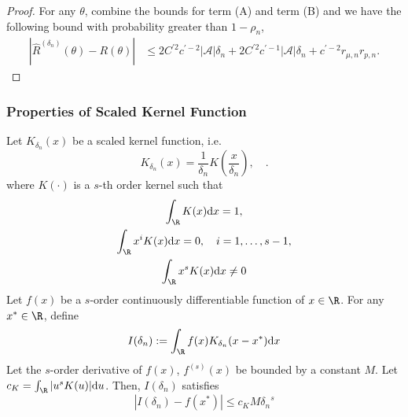 \begin{proof}
\noindent
For any $\theta$, combine the bounds for term (A) and term (B) and we have the following bound with probability greater than $1-\rho_n$,
\begin{align*}
    \left| \widehat R^{({\delta_n})}(\theta) - R(\theta) \right|&\leq 2C^{\prime2}c^{\prime-2}|\mathcal{A}|\delta_n +2C^{\prime2}c^{\prime-1}|\mathcal{A}|\delta_n + c^{\prime-2}r_{\mu,n}r_{p,n}.
\end{align*}

\end{proof}

\subsubsection{Properties of Scaled Kernel Function}

\begin{lemma}\label{lemma:bias_rate_of_kernel_convolution} Let $K_{\delta_n}(x)$ be a scaled kernel function, i.e.
$$K_{\delta_n}(x) = \frac{1}{{\delta_n}}K\left(\frac{x}{{\delta_n}}\right),\quad .$$
where $K(\cdot)$ is a $s$-th order kernel such that
\begin{gather*}
    \int_{\R}K(x)\mathrm{d}x = 1,\\
    \int_{\R}x^iK(x)\mathrm{d}x = 0,\quad i=1,\ldots,s-1,\\
    \int_{\R}x^sK(x)\mathrm{d}x \neq 0
\end{gather*}
Let $f(x)$ be a $s$-order continuously differentiable function of $x\in\R$. For any $x^*\in\R$, define
$$I({\delta_n}) := \int_{\R}f(x)K_{\delta_n}(x-x^*)\mathrm{d}x$$
Let the $s$-order derivative of $f(x)$, $f^{(s)}(x)$ be bounded by a constant $M$. Let $c_K = \int_\R |u^sK(u)|\mathrm{d}u$. Then, $I({\delta_n})$ satisfies 
$$|I({\delta_n}) - f(x^*)|\leq c_K M{\delta_n}^s$$ 
\end{lemma}

